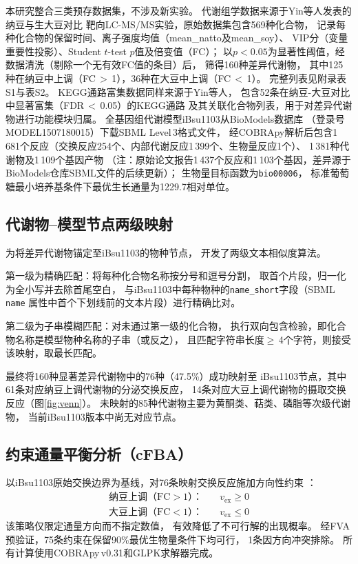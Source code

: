 \documentclass[10pt, a4paper, twocolumn]{ctexart}
\newcommand{\ibsu}{iBsu1103}
\begin{document}
本研究整合三类预存数据集，不涉及新实验。
代谢组学数据来源于Yin等人\citep{Yin2024}发表的纳豆与生大豆对比
靶向LC-MS/MS实验，原始数据集包含569种化合物，
记录每种化合物的保留时间、离子强度均值（mean\_natto及mean\_soy）、
VIP分（变量重要性投影）、Student $t$-test $p$值及倍变值（FC）；
以$p<0.05$为显著性阈值，经数据清洗（剔除一个无有效FC值的条目）后，
筛得160种差异代谢物，
其中125种在纳豆中上调（FC\,$>$\,1），36种在大豆中上调（FC\,$<$\,1）。
完整列表见附录表S1与表S2。
KEGG通路富集数据同样来源于Yin等人\citep{Yin2024}，
包含52条在纳豆-大豆对比中显著富集（FDR\,$<$\,0.05）的KEGG通路
及其关联化合物列表，用于对差异代谢物进行功能模块归属。
全基因组代谢模型\ibsu{}从BioModels数据库
（登录号MODEL1507180015）下载SBML Level\,3格式文件\citep{Henry2009}，
经COBRApy解析后包含1\,681个反应（交换反应254个、内部代谢反应1\,399个、生物量反应1个）、
1\,381种代谢物及1\,109个基因产物
（注：原始论文报告1\,437个反应和1\,103个基因，差异源于BioModels仓库SBML文件的后续更新）；
生物量目标函数为\texttt{bio00006}，
标准葡萄糖最小培养基条件下最优生长通量为1229.7相对单位。

\subsection{代谢物--模型节点两级映射}

为将差异代谢物锚定至\ibsu{}的物种节点，
开发了两级文本相似度算法。

第一级为精确匹配：将每种化合物名称按分号和逗号分割，
取首个片段，归一化为全小写并去除首尾空白，
与\ibsu{}中每种物种的\texttt{name\_short}字段（SBML \texttt{name}
属性中首个下划线前的文本片段）进行精确比对。

第二级为子串模糊匹配：对未通过第一级的化合物，
执行双向包含检验，即化合物名称是模型物种名称的子串（或反之），
且匹配字符串长度$\geq$\,4个字符，则接受该映射，取最长匹配。

最终将160种显著差异代谢物中的76种（47.5\%）成功映射至
\ibsu{}节点，其中61条对应纳豆上调代谢物的分泌交换反应，
14条对应大豆上调代谢物的摄取交换反应（图\ref{fig:venn}）。
未映射的85种代谢物主要为黄酮类、萜类、磷脂等次级代谢物，
当前\ibsu{}版本中尚无对应节点。

\subsection{约束通量平衡分析（cFBA）}

以\ibsu{}原始交换边界为基线，对76条映射交换反应施加方向性约束
\citep{Mahadevan2003}：
\begin{align}
  \text{纳豆上调（FC}>1\text{）：} &\quad v_{\text{ex}} \geq 0 \\
  \text{大豆上调（FC}<1\text{）：} &\quad v_{\text{ex}} \leq 0
\end{align}
该策略仅限定通量方向而不指定数值，
有效降低了不可行解的出现概率\citep{Mahadevan2003}。
经FVA预验证，75条约束在保留90\%最优生物量条件下均可行，
1条因方向冲突排除。
所有计算使用COBRApy\,v0.31\citep{Ebrahim2013}和GLPK求解器完成。
\end{document}

